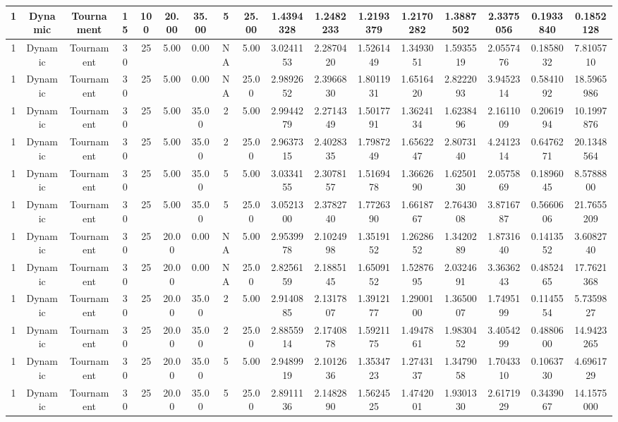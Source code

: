\documentclass[a4paper]{article}
\begin{document}
\begin{center}
\begin{tabular}{ | c | c | c | c | c | c | c | c | c | c | c | c | c | c | c | c | c | }
		\hline
		1	&	Dynamic	&	Tournament	&	15	&	100	&	20.00	&	35.00	&	5	&	25.00	&	1.4394328	&	1.2482233	&	1.2193379	&	1.2170282	&	1.3887502	&	2.3375056	&	0.1933840	&	0.1852128 \\
		\hline
		1	&	Dynamic	&	Tournament	&	30	&	25	&	5.00	&	0.00	&	NA	&	5.00	&	3.0241153	&	2.2870420	&	1.5261449	&	1.3493051	&	1.5935519	&	2.0557476	&	0.1858032	&	7.8105710 \\
		\hline
		1	&	Dynamic	&	Tournament	&	30	&	25	&	5.00	&	0.00	&	NA	&	25.00	&	2.9892652	&	2.3966830	&	1.8011931	&	1.6516420	&	2.8222093	&	3.9452314	&	0.5841092	&	18.5965986 \\
		\hline
		1	&	Dynamic	&	Tournament	&	30	&	25	&	5.00	&	35.00	&	2	&	5.00	&	2.9944279	&	2.2714349	&	1.5017791	&	1.3624134	&	1.6238496	&	2.1611009	&	0.2061994	&	10.1997876 \\
		\hline
		1	&	Dynamic	&	Tournament	&	30	&	25	&	5.00	&	35.00	&	2	&	25.00	&	2.9637315	&	2.4028335	&	1.7987249	&	1.6562247	&	2.8073140	&	4.2412314	&	0.6476271	&	20.1348564 \\
		\hline
		1	&	Dynamic	&	Tournament	&	30	&	25	&	5.00	&	35.00	&	5	&	5.00	&	3.0334155	&	2.3078157	&	1.5169478	&	1.3662690	&	1.6250130	&	2.0575869	&	0.1896045	&	8.5788800 \\
		\hline
		1	&	Dynamic	&	Tournament	&	30	&	25	&	5.00	&	35.00	&	5	&	25.00	&	3.0521300	&	2.3782740	&	1.7726390	&	1.6618767	&	2.7643008	&	3.8716787	&	0.5660606	&	21.7655209 \\
		\hline
		1	&	Dynamic	&	Tournament	&	30	&	25	&	20.00	&	0.00	&	NA	&	5.00	&	2.9539978	&	2.1024998	&	1.3519152	&	1.2628652	&	1.3420289	&	1.8731640	&	0.1413552	&	3.6082740 \\
		\hline
		1	&	Dynamic	&	Tournament	&	30	&	25	&	20.00	&	0.00	&	NA	&	25.00	&	2.8256159	&	2.1885145	&	1.6509152	&	1.5287695	&	2.0324691	&	3.3636243	&	0.4852465	&	17.7621368 \\
		\hline
		1	&	Dynamic	&	Tournament	&	30	&	25	&	20.00	&	35.00	&	2	&	5.00	&	2.9140885	&	2.1317807	&	1.3912177	&	1.2900100	&	1.3650007	&	1.7495199	&	0.1145554	&	5.7359827 \\
		\hline
		1	&	Dynamic	&	Tournament	&	30	&	25	&	20.00	&	35.00	&	2	&	25.00	&	2.8855914	&	2.1740878	&	1.5921175	&	1.4947861	&	1.9830452	&	3.4054299	&	0.4880600	&	14.9423265 \\
		\hline
		1	&	Dynamic	&	Tournament	&	30	&	25	&	20.00	&	35.00	&	5	&	5.00	&	2.9489919	&	2.1012636	&	1.3534723	&	1.2743137	&	1.3479058	&	1.7043310	&	0.1063730	&	4.6961729 \\
		\hline
		1	&	Dynamic	&	Tournament	&	30	&	25	&	20.00	&	35.00	&	5	&	25.00	&	2.8911136	&	2.1482890	&	1.5624525	&	1.4742001	&	1.9301330	&	2.6171929	&	0.3439067	&	14.1575000 \\

\end{tabular}
\end{center}
\end{document}
